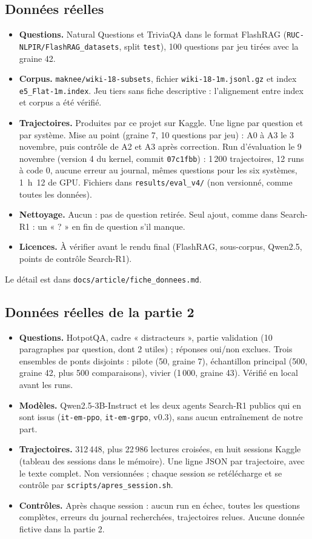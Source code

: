 \documentclass[10pt,a4paper]{article}
\newcommand{\f}[1]{\texttt{\small #1}}
\begin{document}
\subsection*{Données réelles}
\begin{itemize}
\item \textbf{Questions.} Natural Questions et TriviaQA dans le format FlashRAG (\f{RUC-NLPIR/FlashRAG\_datasets}, split \f{test}), 100 questions par jeu tirées avec la graine 42.
\item \textbf{Corpus.} \f{maknee/wiki-18-subsets}, fichier \f{wiki-18-1m.jsonl.gz} et index \f{e5\_Flat-1m.index}. Jeu tiers sans fiche descriptive : l'alignement entre index et corpus a été vérifié.
\item \textbf{Trajectoires.} Produites par ce projet sur Kaggle. Une ligne par question et par système. Mise au point (graine 7, 10 questions par jeu) : A0 à A3 le 3 novembre, puis contrôle de A2 et A3 après correction. Run d'évaluation le 9 novembre (version 4 du kernel, commit \f{07c1fbb}) : 1\,200 trajectoires, 12 runs à code 0, aucune erreur au journal, mêmes questions pour les six systèmes, 1~h~12 de GPU. Fichiers dans \f{results/eval\_v4/} (non versionné, comme toutes les données).
\item \textbf{Nettoyage.} Aucun : pas de question retirée. Seul ajout, comme dans Search-R1 : un « ? » en fin de question s'il manque.
\item \textbf{Licences.} À vérifier avant le rendu final (FlashRAG, sous-corpus, Qwen2.5, points de contrôle Search-R1).
\end{itemize}
Le détail est dans \f{docs/article/fiche\_donnees.md}.

\subsection*{Données réelles de la partie 2}
\begin{itemize}
\item \textbf{Questions.} HotpotQA, cadre « distracteurs », partie validation (10 paragraphes par question, dont 2 utiles) ; réponses oui/non exclues. Trois ensembles de ponts disjoints : pilote (50, graine 7), échantillon principal (500, graine 42, plus 500 comparaisons), vivier (1\,000, graine 43). Vérifié en local avant les runs.
\item \textbf{Modèles.} Qwen2.5-3B-Instruct et les deux agents Search-R1 publics qui en sont issus (\f{it-em-ppo}, \f{it-em-grpo}, v0.3), sans aucun entraînement de notre part.
\item \textbf{Trajectoires.} 312\,448, plus 22\,986 lectures croisées, en huit sessions Kaggle (tableau des sessions dans le mémoire). Une ligne JSON par trajectoire, avec le texte complet. Non versionnées ; chaque session se retélécharge et se contrôle par \f{scripts/apres\_session.sh}.
\item \textbf{Contrôles.} Après chaque session : aucun run en échec, toutes les questions complètes, erreurs du journal recherchées, trajectoires relues. Aucune donnée fictive dans la partie 2.
\end{itemize}
\end{document}
